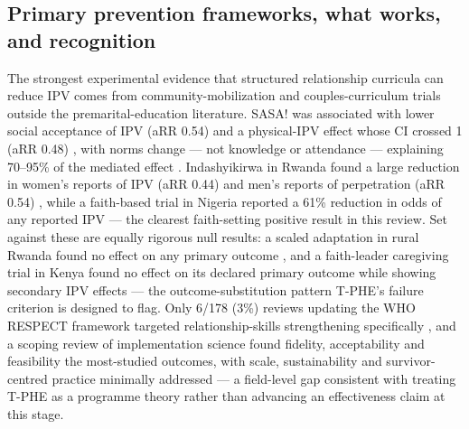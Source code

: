 \documentclass[11pt]{article}
\newcommand{\tphe}{T\mbox{-}PHE}
\begin{document}
\subsection{Primary prevention frameworks, what works, and recognition}
The strongest experimental evidence that structured relationship curricula can reduce IPV comes from community-mobilization and couples-curriculum trials outside the premarital-education literature. SASA! was associated with lower social acceptance of IPV (aRR 0.54) and a physical-IPV effect whose CI crossed 1 (aRR 0.48) \cite{ref24}, with norms change --- not knowledge or attendance --- explaining 70--95\% of the mediated effect \cite{ref25}. Indashyikirwa in Rwanda found a large reduction in women's reports of IPV (aRR 0.44) and men's reports of perpetration (aRR 0.54) \cite{ref26}, while a faith-based trial in Nigeria reported a 61\% reduction in odds of any reported IPV \cite{ref27} --- the clearest faith-setting positive result in this review. Set against these are equally rigorous null results: a scaled adaptation in rural Rwanda found no effect on any primary outcome \cite{ref28}, and a faith-leader caregiving trial in Kenya found no effect on its declared primary outcome while showing secondary IPV effects \cite{ref29} --- the outcome-substitution pattern \tphe{}'s failure criterion is designed to flag. Only 6/178 (3\%) reviews updating the WHO RESPECT framework targeted relationship-skills strengthening specifically \cite{ref30}, and a scoping review of implementation science found fidelity, acceptability and feasibility the most-studied outcomes, with scale, sustainability and survivor-centred practice minimally addressed \cite{ref31} --- a field-level gap consistent with treating \tphe{} as a programme theory rather than advancing an effectiveness claim at this stage.
\end{document}
